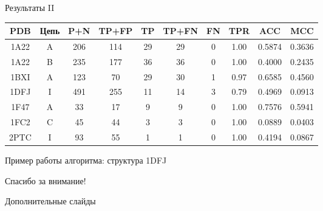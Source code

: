 \documentclass[12pt, xcolor={dvipsnames}]{beamer}
\begin{document}
\begin{frame}{Результаты II}
\begin{tabular}{|c|c|c|c|c|c|c|c|c|c|}
\hline
PDB & Цепь & P+N & TP+FP & TP & TP+FN & FN & TPR & ACC & MCC\\
\hline
1A22 & A & 206 & 114 & 29 & 29 & 0 & 1.00 & 0.5874 & 0.3636\\
1A22 & B & 235 & 177 & 36 & 36 & 0 & 1.00 &
0.4000 & 0.2435
\\
1BXI & A & 123 & 70& 29& 30& 1 & 0.97 &
0.6585 & 0.4560
\\
1DFJ & I & 491 & 255& 11& 14& 3 & 0.79 &
0.4969 & 0.0913
\\
1F47 & A & 33 & 17& 9& 9& 0 & 1.00 &
0.7576 & 0.5941
\\
1FC2 & C & 45 & 44& 3& 3& 0 & 1.00 &
0.0889 & 0.0403
\\
2PTC & I & 93 & 55& 1& 1& 0 & 1.00 &
0.4194 & 0.0867\\
\hline
\end{tabular}
\end{frame}
\begin{frame}{Пример работы алгоритма: структура 1DFJ}
\begin{center}
\end{center}
\end{frame}
\begin{frame}
Спасибо за внимание!
\end{frame}

\appendix
\begin{frame}
Дополнительные слайды
\end{frame}
\end{document}
